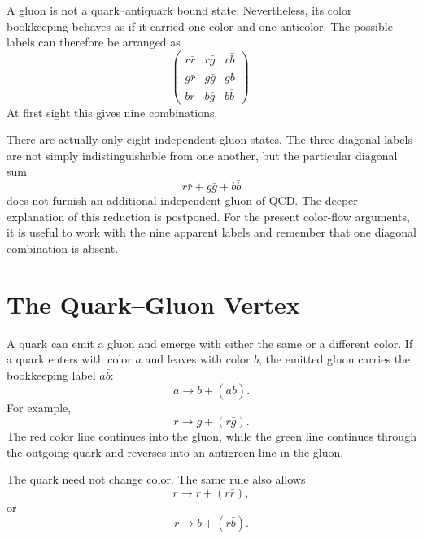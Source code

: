 A gluon is not a quark--antiquark bound state. Nevertheless, its color bookkeeping behaves as if it carried one color and one anticolor. The possible labels can therefore be arranged as
\begin{equation}
\begin{pmatrix}
r\bar r&r\bar g&r\bar b\\
g\bar r&g\bar g&g\bar b\\
b\bar r&b\bar g&b\bar b
\end{pmatrix}.
\end{equation}
At first sight this gives nine combinations.

\begin{classroomqa}
\end{classroomqa}

There are actually only eight independent gluon states. The three diagonal labels are not simply indistinguishable from one another, but the particular diagonal sum
\begin{equation}
r\bar r+g\bar g+b\bar b
\end{equation}
does not furnish an additional independent gluon of QCD. The deeper explanation of this reduction is postponed. For the present color-flow arguments, it is useful to work with the nine apparent labels and remember that one diagonal combination is absent.

\section{The Quark--Gluon Vertex}

A quark can emit a gluon and emerge with either the same or a different color. If a quark enters with color \(a\) and leaves with color \(b\), the emitted gluon carries the bookkeeping label \(a\bar b\):
\begin{equation}
a\longrightarrow b+(a\bar b).
\end{equation}
For example,
\begin{equation}
r\longrightarrow g+(r\bar g).
\end{equation}
The red color line continues into the gluon, while the green line continues through the outgoing quark and reverses into an antigreen line in the gluon.

The quark need not change color. The same rule also allows
\begin{equation}
r\longrightarrow r+(r\bar r),
\end{equation}
or
\begin{equation}
r\longrightarrow b+(r\bar b).
\end{equation}

